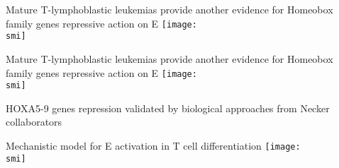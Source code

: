 \documentclass[10pt, usenames, dvipsnames]{beamer}
\def\smi{out/ln/updir/mw-gcthesis-oral/library.bib}
\begin{document}
\begin{frame}{Mature T-lymphoblastic leukemias provide another evidence for Homeobox family genes repressive action on E\textalpha{}}
  \def\smi{out/ln/updir/mw-gcthesis-oral/ink/tall/H3K27ac_HOXA5-9_TLX1_TLX3_ealpha_barplot.png}
  \texttt{[image: \\smi]}%
\end{frame}
\begin{frame}{Mature T-lymphoblastic leukemias provide another evidence for Homeobox family genes repressive action on E\textalpha{}}
  \def\smi{out/ln/updir/mw-gcthesis-oral/ink/tall/ealpha_h3k27ac_groups.pdf}
  \texttt{[image: \\smi]}%
\end{frame}
  \begin{frame}[standout]
    HOXA5-9 genes repression validated by biological approaches from Necker collaborators
\end{frame}
\begin{frame}{Mechanistic model for E\textalpha{} activation in T cell differentiation}
  \def\smi{out/ln/updir/mw-gcthesis-oral/ink/Highlight_HOXA_Blueprint_paper.pdf}
  \texttt{[image: \\smi]}%
\end{frame}
\end{document}
